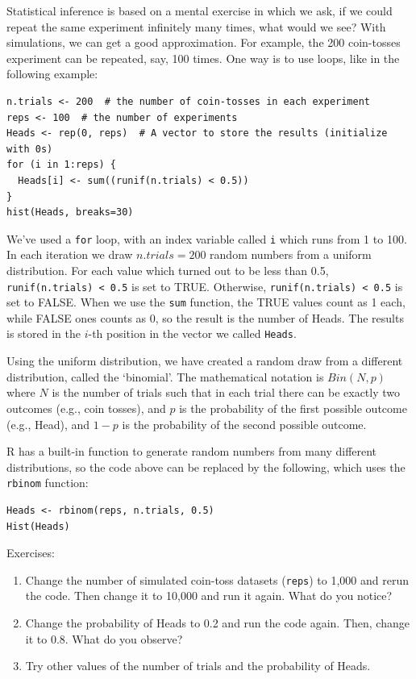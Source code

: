 \documentclass[11pt]{article}
\theoremstyle{definition}
\begin{document}
Statistical inference is based on a mental exercise in which we ask, if we could repeat the same experiment infinitely many times, what would we see? With simulations, we can get a good approximation. For example, the 200 coin-tosses experiment can be repeated, say, 100 times. One way is to use loops, like in the following example:
\begin{verbatim}
n.trials <- 200  # the number of coin-tosses in each experiment
reps <- 100  # the number of experiments
Heads <- rep(0, reps)  # A vector to store the results (initialize with 0s)
for (i in 1:reps) {
  Heads[i] <- sum((runif(n.trials) < 0.5))
}
hist(Heads, breaks=30)
\end{verbatim}
We've used a \texttt{for} loop, with an index variable called \texttt{i} which runs from 1 to 100. In each iteration we draw $n.trials=200$ random numbers from a uniform distribution. For each value which turned out to be less than 0.5, \texttt{runif(n.trials) < 0.5} is set to TRUE. Otherwise, \texttt{runif(n.trials) < 0.5} is set to FALSE. When we use the \texttt{sum} function, the TRUE values count as 1 each, while FALSE ones counts as 0, so the result is the number of Heads. The results is stored in the $i$-th position in the vector we called \texttt{Heads}.

Using the uniform distribution, we have created a random draw from a different distribution, called the `binomial'. The mathematical notation is $Bin(N, p)$ where $N$ is the number of trials such that in each trial there can be exactly two outcomes (e.g., coin tosses), and $p$ is the probability of the first possible outcome (e.g., Head), and $1-p$ is the probability of the second possible outcome.

R has a built-in function to generate random numbers from many different distributions, so the code above can be replaced by the following, which uses the \texttt{rbinom} function:
\begin{verbatim}
Heads <- rbinom(reps, n.trials, 0.5)
Hist(Heads)
\end{verbatim}


Exercises:
\begin{enumerate}
\item Change the number of simulated coin-toss datasets (\texttt{reps}) to 1,000 and rerun the code. Then change it to 10,000 and run it again. What do you notice?
\item Change the probability of Heads to 0.2 and run the code again. Then, change it to 0.8. What do you observe?
\item Try other values of the number of trials and the probability of Heads.
\end{enumerate}
\end{document}
